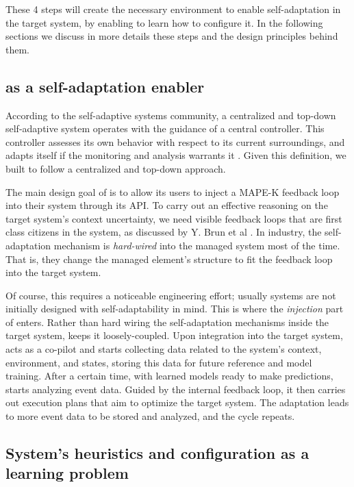 These 4 steps will create the necessary environment to enable self-adaptation in the target system, by enabling \projectname{} to learn how to configure it. In the following sections we discuss in more details these steps and the design principles behind them.

\subsection{\projectname{} as a self-adaptation enabler}

According to the self-adaptive systems community, a centralized and top-down self-adaptive system operates with the guidance of a central controller. This controller assesses its own behavior with respect to its current surroundings, and adapts itself if the monitoring and analysis warrants it \cite{brun_engineering_2009}. Given this definition, we built \projectname{} to follow a centralized and top-down approach.

The main design goal of \projectname{} is to allow its users to inject a MAPE-K feedback loop into their system through its API. To carry out an effective reasoning on the target system's context uncertainty, we need visible feedback loops that are first class citizens in the system, as discussed by Y. Brun et al \cite{brun_engineering_2009}. In industry, the self-adaptation mechanism is \emph{hard-wired} into the managed system most of the time. That is, they change the managed element's structure to fit the feedback loop into the target system.

Of course, this requires a noticeable engineering effort; usually systems are not initially designed with self-adaptability in mind. This is where the \emph{injection} part of \projectname{} enters. Rather than hard wiring the self-adaptation mechanisms inside the target system, \projectname{} keeps it loosely-coupled. Upon integration into the target system, \projectname{} acts as a co-pilot and starts collecting data related to the system's context, environment, and states, storing this data for future reference and model training. After a certain time, with learned models ready to make predictions, \projectname{} starts analyzing event data. Guided by the internal feedback loop, it then carries out execution plans that aim to optimize the target system. The adaptation leads to more event data to be stored and analyzed, and the cycle repeats.

\subsection{System's heuristics and configuration as a learning problem}

